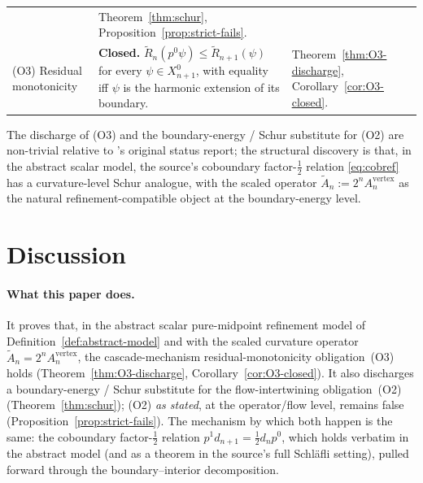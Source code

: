 \documentclass[11pt]{article}
\theoremstyle{plain}
\theoremstyle{definition}
\theoremstyle{remark}
\begin{document}
\begin{longtable}{>{\raggedright\arraybackslash}p{}>{\raggedright\arraybackslash}p{}>{\raggedright\arraybackslash}p{}}
& Theorem~\ref{thm:schur}, Proposition~\ref{prop:strict-fails}. \\
(O3) Residual monotonicity
& \textbf{Closed.} $\widetilde R_n(p^{0} \psi) \le \widetilde R_{n+1}(\psi)$ for every $\psi \in X_{n+1}^{0}$, with equality iff $\psi$ is the harmonic extension of its boundary.
& Theorem~\ref{thm:O3-discharge}, Corollary~\ref{cor:O3-closed}. \\
\bottomrule
\end{longtable}

The discharge of (O3) and the boundary-energy / Schur substitute
for (O2) are non-trivial relative to
\cite{CascadeMechanism}'s original status
report; the structural discovery is that, in the abstract scalar
model, the source's coboundary factor-$\tfrac12$ relation
\eqref{eq:cobref} has a curvature-level Schur analogue, with the
scaled operator $\widetilde A_n := 2^n A_n^{\mathrm{vertex}}$ as the
natural refinement-compatible object at the boundary-energy level.

\section{Discussion}\label{sec:discussion}

\paragraph*{What this paper does.}
It proves that, in the abstract scalar pure-midpoint refinement
model of Definition~\ref{def:abstract-model} and with the scaled
curvature operator $\widetilde A_n = 2^n A_n^{\mathrm{vertex}}$,
the cascade-mechanism residual-monotonicity obligation~(O3) holds
(Theorem~\ref{thm:O3-discharge}, Corollary~\ref{cor:O3-closed}). It
also discharges a boundary-energy / Schur substitute for the
flow-intertwining obligation~(O2) (Theorem~\ref{thm:schur}); (O2)
\emph{as stated}, at the operator/flow level, remains false
(Proposition~\ref{prop:strict-fails}). The
mechanism by which both happen is the same: the coboundary
factor-$\tfrac12$ relation
$p^{1} d_{n+1} = \tfrac12 d_n p^{0}$, which holds verbatim in the
abstract model (and as a theorem in the source's full Schl\"{a}fli
setting), pulled forward through the boundary--interior
decomposition.
\end{document}
